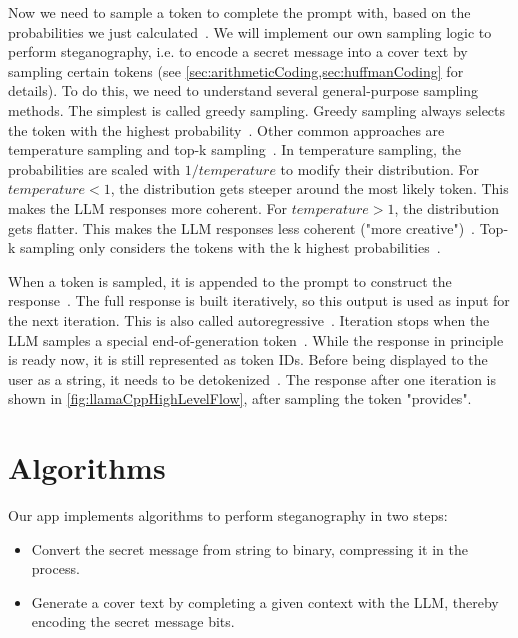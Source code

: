 Now we need to sample a token to complete the prompt with, based on the probabilities we just calculated~\cite{mallisUnderstandingHowLLM2023}. We will implement our own sampling logic to perform steganography, i.e. to encode a secret message into a cover text by sampling certain tokens (see \cref{sec:arithmeticCoding,sec:huffmanCoding} for details). To do this, we need to understand several general-purpose sampling methods. The simplest is called greedy sampling. Greedy sampling always selects the token with the highest probability~\cite{mallisUnderstandingHowLLM2023}. Other common approaches are temperature sampling and top-k sampling~\cite{mallisUnderstandingHowLLM2023}. In temperature sampling, the probabilities are scaled with $1/temperature$ to modify their distribution. For $temperature < 1$, the distribution gets steeper around the most likely token. This makes the \gls{LLM} responses more coherent. For $temperature > 1$, the distribution gets flatter. This makes the \gls{LLM} responses less coherent ("more creative")~\cite{mallisUnderstandingHowLLM2023}. Top-k sampling only considers the tokens with the k highest probabilities~\cite{mallisUnderstandingHowLLM2023}.

When a token is sampled, it is appended to the prompt to construct the response~\cite{mallisUnderstandingHowLLM2023}. The full response is built iteratively, so this output is used as input for the next iteration. This is also called autoregressive~\cite{mallisUnderstandingHowLLM2023}. Iteration stops when the \gls{LLM} samples a special end-of-generation token~\cite{gerganovGgerganovLlamacpp2024}. While the response in principle is ready now, it is still represented as token IDs. Before being displayed to the user as a string, it needs to be detokenized~\cite{mallisUnderstandingHowLLM2023}. The response after one iteration is shown in \cref{fig:llamaCppHighLevelFlow}, after sampling the token "provides".

\section{Algorithms}
\label{sec:algorithms}
Our app implements algorithms to perform steganography in two steps:
\begin{itemize}
    \item Convert the secret message from string to binary, compressing it in the process.
    \item Generate a cover text by completing a given context with the \gls{LLM}, thereby encoding the secret message bits.
\end{itemize}

